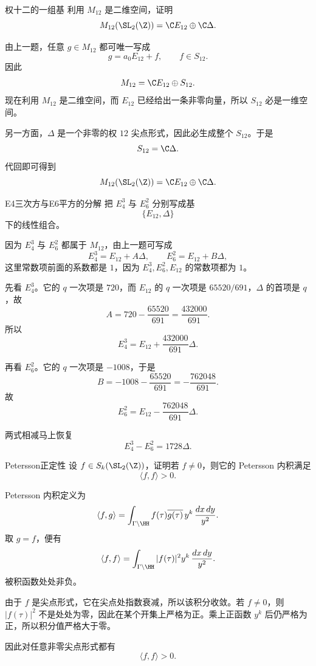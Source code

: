 \begin{problem}{权十二的一组基}
\hard
利用 $M_{12}$ 是二维空间，证明
\[
M_{12}(\SL_2(\Z))=\C E_{12}\oplus \C\Delta.
\]
\end{problem}
\begin{solution}
由上一题，任意 $g\in M_{12}$ 都可唯一写成
\[
g=a_0E_{12}+f,
\qquad f\in S_{12}.
\]
因此
\[
M_{12}=\C E_{12}\oplus S_{12}.
\]
现在利用 $M_{12}$ 是二维空间，而 $E_{12}$ 已经给出一条非零向量，所以 $S_{12}$ 必是一维空间。

另一方面，$\Delta$ 是一个非零的权 $12$ 尖点形式，因此必生成整个 $S_{12}$。于是
\[
S_{12}=\C\Delta.
\]
代回即可得到
\[
M_{12}(\SL_2(\Z))=\C E_{12}\oplus \C\Delta.
\]
\end{solution}

\begin{problem}{E4三次方与E6平方的分解}
\hard
把 $E_4^3$ 与 $E_6^2$ 分别写成基
\[
\{E_{12},\Delta\}
\]
下的线性组合。
\end{problem}
\begin{solution}
因为 $E_4^3$ 与 $E_6^2$ 都属于 $M_{12}$，由上一题可写成
\[
E_4^3=E_{12}+A\Delta,
\qquad
E_6^2=E_{12}+B\Delta,
\]
这里常数项前面的系数都是 $1$，因为 $E_4^3,E_6^2,E_{12}$ 的常数项都为 $1$。

先看 $E_4^3$。它的 $q$ 一次项是 $720$，而 $E_{12}$ 的 $q$ 一次项是 $65520/691$，$\Delta$ 的首项是 $q$，故
\[
A=720-\frac{65520}{691}=\frac{432000}{691}.
\]
所以
\[
E_4^3=E_{12}+\frac{432000}{691}\Delta.
\]

再看 $E_6^2$。它的 $q$ 一次项是 $-1008$，于是
\[
B=-1008-\frac{65520}{691}=-\frac{762048}{691}.
\]
故
\[
E_6^2=E_{12}-\frac{762048}{691}\Delta.
\]

两式相减马上恢复
\[
E_4^3-E_6^2=1728\Delta.
\]
\end{solution}

\begin{problem}{Petersson正定性}
\hard
设 $f\in S_k(\SL_2(\Z))$，证明若 $f\ne 0$，则它的 Petersson 内积满足
\[
\langle f,f\rangle>0.
\]
\end{problem}
\begin{solution}
Petersson 内积定义为
\[
\langle f,g\rangle=\int_{\Gamma\backslash\HH} f(\tau)\overline{g(\tau)}\,y^k\,\frac{dx\,dy}{y^2}.
\]
取 $g=f$，便有
\[
\langle f,f\rangle=\int_{\Gamma\backslash\HH}|f(\tau)|^2y^k\,\frac{dx\,dy}{y^2}.
\]
被积函数处处非负。

由于 $f$ 是尖点形式，它在尖点处指数衰减，所以该积分收敛。若 $f\ne 0$，则 $|f(\tau)|^2$ 不是处处为零，因此在某个开集上严格为正。乘上正函数 $y^k$ 后仍严格为正，所以积分值严格大于零。

因此对任意非零尖点形式都有
\[
\langle f,f\rangle>0.
\]
\end{solution}

